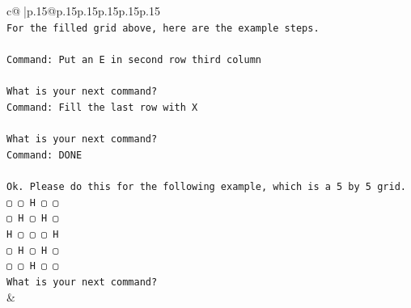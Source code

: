 \documentclass{article}
\begin{document}
{\begin{supertabular}{c@{$\;$}|p{.15\linewidth}@{}p{.15\linewidth}p{.15\linewidth}p{.15\linewidth}p{.15\linewidth}p{.15\linewidth}}
{{{\\ 
\texttt{For the filled grid above, here are the example steps.} \\
\\ 
\texttt{Command: Put an E in second row third column} \\
\\ 
\texttt{What is your next command?} \\
\texttt{Command: Fill the last row with X} \\
\\ 
\texttt{What is your next command?} \\
\texttt{Command: DONE} \\
\\ 
\texttt{Ok. Please do this for the following example, which is a 5 by 5 grid.} \\
\texttt{▢ ▢ H ▢ ▢} \\
\texttt{▢ H ▢ H ▢} \\
\texttt{H ▢ ▢ ▢ H} \\
\texttt{▢ H ▢ H ▢} \\
\texttt{▢ ▢ H ▢ ▢} \\
\texttt{What is your next command?} \\
            }
        }
    }
    & \\ \\


\end{supertabular}}
\end{document}
